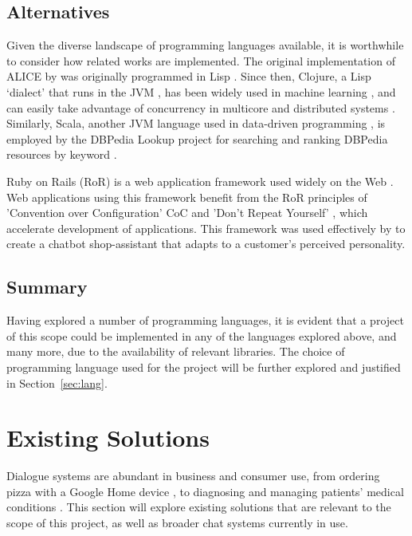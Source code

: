 \subsection{Alternatives}
Given the diverse landscape of programming languages available, it is worthwhile to consider how related works are implemented. The original implementation of ALICE by \citet{wallace2009anatomy} was originally programmed in Lisp \cite{winston1986lisp}. Since then, Clojure, a Lisp `dialect' that runs in the JVM \cite{hickey2008clojure}, has been widely used in machine learning \cite{wali2014clojure}, and can easily take advantage of concurrency in multicore and distributed systems \cite{emerick2012clojure}. Similarly, Scala, another JVM language used in data-driven programming \cite{wampler2014programming}, is employed by the DBPedia Lookup project for searching and ranking DBPedia resources by keyword \cite{dbpedialookup}.

Ruby on Rails (RoR) is a web application framework used widely on the Web \cite{paplauskaite2016}. Web applications using this framework benefit from the RoR principles of 'Convention over Configuration' CoC and 'Don't Repeat Yourself' \cite{bachle2007ruby}, which accelerate development of applications. This framework was used effectively by \citet{horzyk2009intelligent} to create a chatbot shop-assistant that adapts to a customer's perceived personality.

\subsection{Summary}
Having explored a number of programming languages, it is evident that a project of this scope could be implemented in any of the languages explored above, and many more, due to the availability of relevant libraries. The choice of programming language used for the project will be further explored and justified in Section~\ref{sec:lang}.

\section{Existing Solutions}
\label{sec:existing}
Dialogue systems are abundant in business and consumer use, from ordering pizza with a Google Home device \cite{google2018dominos}, to diagnosing and managing patients’ medical conditions \cite{yourmd2017}. This section will explore existing solutions that are relevant to the scope of this project, as well as broader chat systems currently in use.

